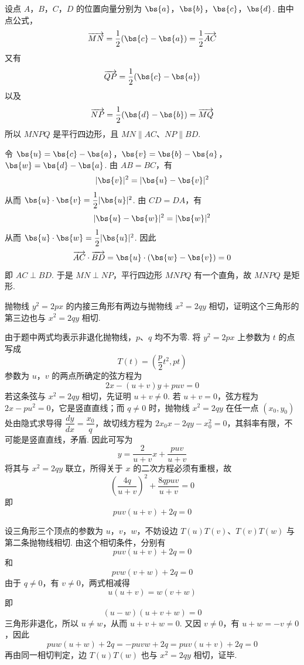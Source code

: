 \begin{solution}
设点 \(A\)，\(B\)，\(C\)，\(D\) 的位置向量分别为 \(\bs{a}\)，\(\bs{b}\)，\(\bs{c}\)，\(\bs{d}\). 由中点公式，
\[
\overrightarrow{MN}=\dfrac12(\bs{c}-\bs{a})=\dfrac12\overrightarrow{AC}
\]
又有
\[
\overrightarrow{QP}=\dfrac12(\bs{c}-\bs{a})
\]
以及
\[
\overrightarrow{NP}=\dfrac12(\bs{d}-\bs{b})=\overrightarrow{MQ}
\]
所以 \(MNPQ\) 是平行四边形，且 \(MN\parallel AC\)、\(NP\parallel BD\).

令 \(\bs{u}=\bs{c}-\bs{a}\)，\(\bs{v}=\bs{b}-\bs{a}\)，\(\bs{w}=\bs{d}-\bs{a}\). 由 \(AB=BC\)，有
\[
|\bs{v}|^2=|\bs{u}-\bs{v}|^2
\]
从而 \(\bs{u}\cdot\bs{v}=\dfrac12|\bs{u}|^2\). 由 \(CD=DA\)，有
\[
|\bs{u}-\bs{w}|^2=|\bs{w}|^2
\]
从而 \(\bs{u}\cdot\bs{w}=\dfrac12|\bs{u}|^2\). 因此
\[
\overrightarrow{AC}\cdot\overrightarrow{BD}=\bs{u}\cdot(\bs{w}-\bs{v})=0
\]
即 \(AC\perp BD\). 于是 \(MN\perp NP\)，平行四边形 \(MNPQ\) 有一个直角，故 \(MNPQ\) 是矩形.
\end{solution}

\begin{problem}

抛物线 \(y^2=2px\) 的内接三角形有两边与抛物线 \(x^2=2qy\) 相切，证明这个三角形的第三边也与 \(x^2=2qy\) 相切.
\end{problem}

\begin{solution}
由于题中两式均表示非退化抛物线，\(p\)、\(q\) 均不为零. 将 \(y^2=2px\) 上参数为 \(t\) 的点写成
\[
T(t)=\left(\dfrac{p}{2}t^2,pt\right)
\]
参数为 \(u\)，\(v\) 的两点所确定的弦方程为
\[
2x-(u+v)y+puv=0
\]
若这条弦与 \(x^2=2qy\) 相切，先证明 \(u+v\neq0\). 若 \(u+v=0\)，弦方程为 \(2x-pu^2=0\)，它是竖直直线；而 \(q\neq0\) 时，抛物线 \(x^2=2qy\) 在任一点 \(\left(x_0,y_0\right)\) 处由隐式求导得 \(\dfrac{dy}{dx}=\dfrac{x_0}{q}\)，故切线方程为 \(2x_0x-2qy-x_0^2=0\)，其斜率有限，不可能是竖直直线，矛盾. 因此可写为
\[
y=\dfrac{2}{u+v}x+\dfrac{puv}{u+v}
\]
将其与 \(x^2=2qy\) 联立，所得关于 \(x\) 的二次方程必须有重根，故
\[
\left(\dfrac{4q}{u+v}\right)^2+\dfrac{8qpuv}{u+v}=0
\]
即
\[
puv(u+v)+2q=0
\]

设三角形三个顶点的参数为 \(u\)，\(v\)，\(w\)，不妨设边 \(T(u)T(v)\)、\(T(v)T(w)\) 与第二条抛物线相切. 由这个相切条件，分别有
\[
puv(u+v)+2q=0
\]
和
\[
pvw(v+w)+2q=0
\]
由于 \(q\neq0\)，有 \(v\neq0\)，两式相减得
\[
u(u+v)=w(v+w)
\]
即
\[
(u-w)(u+v+w)=0
\]
三角形非退化，所以 \(u\neq w\)，从而 \(u+v+w=0\). 又因 \(v\neq0\)，有 \(u+w=-v\neq0\)，因此
\[
puw(u+w)+2q=-puvw+2q=puv(u+v)+2q=0
\]
再由同一相切判定，边 \(T(u)T(w)\) 也与 \(x^2=2qy\) 相切，证毕.
\end{solution}

